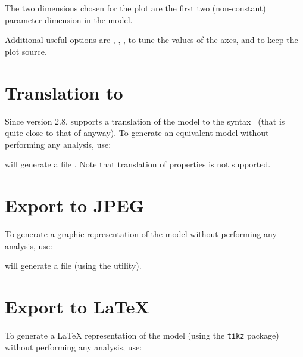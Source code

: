 The two dimensions chosen for the plot are the first two (non-constant) parameter dimension in the model.

Additional useful options are
,
,
,
to tune the values of the axes,
and  to keep the plot source.


\section{Translation to \hytech{}}

Since version 2.8, \imitator{} supports a translation of the model to the \hytech{} syntax~\cite{HHW95} (that is quite close to that of \imitator{} anyway).
To generate an equivalent \hytech{} model without performing any analysis, use:


\imitator{} will generate a file .
Note that translation of properties is not supported.



\section{Export to JPEG}

To generate a graphic representation of the \NIPTA{} model without performing any analysis, use:


\imitator{} will generate a file  (using the \gdot{} utility).



\section{Export to \LaTeX{}}

To generate a \LaTeX{} representation of the \NIPTA{} model (using the \texttt{tikz} package) without performing any analysis, use:

